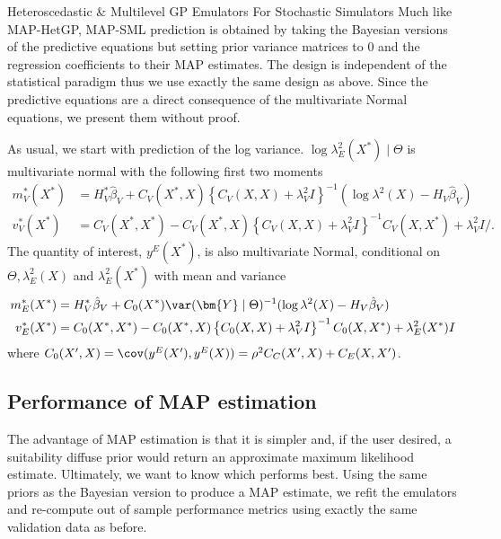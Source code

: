 \begin{chapter}{Heteroscedastic \& Multilevel GP Emulators For Stochastic Simulators\label{Ch:Hetsml}}
Much like MAP-HetGP, MAP-SML prediction is obtained by taking the Bayesian versions of the predictive equations but setting prior variance matrices to $0$ and the regression coefficients to their MAP estimates. The design is independent of the statistical paradigm thus we use exactly the same design as above. Since the predictive equations are a direct consequence of the multivariate Normal equations, we present them without proof.

As usual, we start with prediction of the log variance.  $\log \lambda^2_E(X^*) \mid \Theta$ is multivariate normal with the following first two moments
\begin{align}
	m_V^*(X^*) &= H_V^* \hat{\beta}_V + C_V(X^*, X) \left\{C_V(X, X) + \lambda_V^2 I \right\}^{-1} (\log \lambda^2 (X) - H_V\hat{\beta}_V) \\
	v_V^*(X^*) &= C_V(X^*, X^*) - C_V(X^*, X) \left\{C_V(X, X) + \lambda_V^2 I \right\}^{-1} C_V(X, X^*) + \lambda^2_V I/.
\end{align}
The quantity of interest, $y^E(X^*)$, is also multivariate Normal, conditional on $\Theta, \lambda^2_E(X)$ and $\lambda_E^2(X^*)$ with mean and variance
\begin{align}
	m_E^*(X^*) &= H_V^* \hat{\beta}_V +C_0(X^*) \var(\bm{Y} \mid \Theta)^{-1} (\log \lambda^2 (X) - H_V\hat{\beta}_V) \\
	v_E^*(X^*) &= C_0(X^*, X^*) - C_0(X^*, X) \left\{C_0(X, X) + \lambda_V^2 I \right\}^{-1} C_0(X, X^*) + \lambda^2_E(X^*)I
\end{align}
where $C_0(X', X) = \cov(y^E(X'), y^E(X)) = \rho^2C_C(X', X) + C_E(X, X')$.

\subsection{Performance of MAP estimation}

The advantage of MAP estimation is that it is simpler and, if the user desired, a suitability diffuse prior would return an approximate maximum likelihood estimate. Ultimately, we want to know which performs best. Using the same priors as the Bayesian version to produce a MAP estimate, we refit the emulators and re-compute out of sample performance metrics using exactly the same validation data as before.


\end{chapter}
